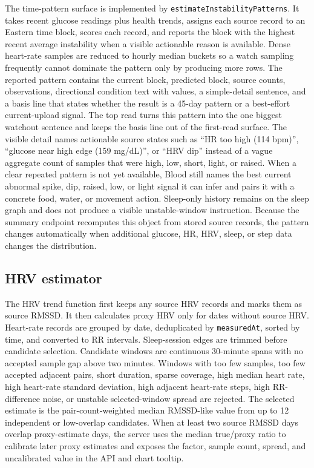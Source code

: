 \documentclass[12pt,letterpaper]{article}
\begin{document}
The time-pattern surface is implemented by \texttt{estimateInstabilityPatterns}. It takes recent glucose readings plus health trends, assigns each source record to an Eastern time block, scores each record, and reports the block with the highest recent average instability when a visible actionable reason is available. Dense heart-rate samples are reduced to hourly median buckets so a watch sampling frequently cannot dominate the pattern only by producing more rows. The reported pattern contains the current block, predicted block, source counts, observations, directional condition text with values, a simple-detail sentence, and a basis line that states whether the result is a 45-day pattern or a best-effort current-upload signal. The top read turns this pattern into the one biggest watchout sentence and keeps the basis line out of the first-read surface. The visible detail names actionable source states such as \enquote{HR too high (114 bpm)}, \enquote{glucose near high edge (159 mg/dL)}, or \enquote{HRV dip} instead of a vague aggregate count of samples that were high, low, short, light, or raised. When a clear repeated pattern is not yet available, Blood still names the best current abnormal spike, dip, raised, low, or light signal it can infer and pairs it with a concrete food, water, or movement action. Sleep-only history remains on the sleep graph and does not produce a visible unstable-window instruction. Because the summary endpoint recomputes this object from stored source records, the pattern changes automatically when additional glucose, HR, HRV, sleep, or step data changes the distribution.

\subsection{HRV estimator}

The HRV trend function first keeps any source HRV records and marks them as source RMSSD. It then calculates proxy HRV only for dates without source HRV. Heart-rate records are grouped by date, deduplicated by \texttt{measuredAt}, sorted by time, and converted to RR intervals. Sleep-session edges are trimmed before candidate selection. Candidate windows are continuous 30-minute spans with no accepted sample gap above two minutes. Windows with too few samples, too few accepted adjacent pairs, short duration, sparse coverage, high median heart rate, high heart-rate standard deviation, high adjacent heart-rate steps, high RR-difference noise, or unstable selected-window spread are rejected. The selected estimate is the pair-count-weighted median RMSSD-like value from up to 12 independent or low-overlap candidates. When at least two source RMSSD days overlap proxy-estimate days, the server uses the median true/proxy ratio to calibrate later proxy estimates and exposes the factor, sample count, spread, and uncalibrated value in the API and chart tooltip.
\end{document}
